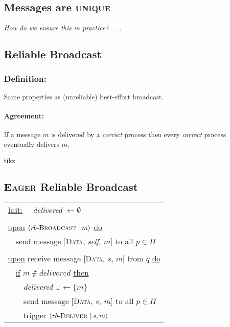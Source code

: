 \documentclass{article}
\begin{document}
\begin{adjustwidth}{2em}{2em}
		\subsection{Messages are \textsc{unique}}
		\begin{adjustwidth}{2em}{2em}
			\textit{How do we ensure this in practice?}
			.
			.
			.
		\end{adjustwidth}
		\subsection{Reliable Broadcast}
		\begin{adjustwidth}{2em}{2em}
			\subsubsection{Definition:}
			\begin{adjustwidth}{2em}{}
				Same properties as (unreliable) best-effort broadcast.
				\paragraph{Agreement:}
				\begin{adjustwidth}{1em}{}
					If a message $m$ is delivered by a \textit{correct} process then every \textit{correct} process eventually delivers $m$. \\
					\begin{center}
						tikz
					\end{center}
				\end{adjustwidth}
			\end{adjustwidth}
		\end{adjustwidth}
		\subsection{\textsc{Eager} Reliable Broadcast}
		\begin{center}
			\begin{tabular}{l}
				\underline{Init:}
				\ \ \textit{delivered} $\leftarrow \emptyset$ \\
				\\
				\underline{upon} $\langle \textit{rb-}\textsc{Broadcast} \mid m \rangle$ \underline{do} \\
				\ \ send message [\textsc{Data}, \textit{self}, $m$] to all $p \in \Pi$ \\
				\\
				\underline{upon} receive message [\textsc{Data}, $s$, $m$] from $q$ \underline{do} \\
				\ \ \underline{if} $m \not\in \textit{delivered}$ \underline{then} \\
				\ \ \ \ \textit{delivered} $\cup \leftarrow \{ m \}$ \\
				\ \ \ \ send message [\textsc{Data}, $s$, $m$] to all $p \in \Pi$ \\
				\ \ \ \ trigger $\langle \textit{rb-}\textsc{Deliver} \mid s, m \rangle$
			\end{tabular}
		\end{center}
		\begin{adjustwidth}{2em}{2em}

\end{adjustwidth}
\end{adjustwidth}
\end{document}
